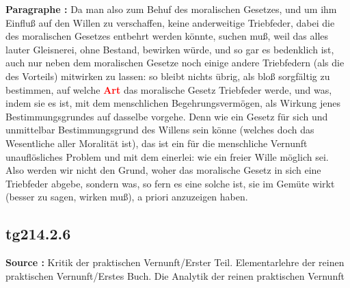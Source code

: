 \documentclass[a4paper,12pt,twoside]{book}
\newcommand{\match}[1]{\textcolor{red}{\textbf{#1}}}
\begin{document}
	\noindent\textbf{Paragraphe : }Da man also zum Behuf des moralischen Gesetzes, und um ihm Einfluß auf den Willen zu verschaffen, keine anderweitige Triebfeder, dabei die des moralischen Gesetzes entbehrt werden könnte, suchen muß, weil das alles lauter Gleisnerei, ohne Bestand, bewirken würde, und so gar es bedenklich ist, auch nur neben dem moralischen Gesetze noch einige andere Triebfedern (als die des Vorteils) mitwirken zu lassen: so bleibt nichts übrig, als bloß sorgfältig zu bestimmen, auf welche \match{Art} das moralische Gesetz Triebfeder werde, und was, indem sie es ist, mit dem menschlichen Begehrungsvermögen, als Wirkung jenes Bestimmungsgrundes auf dasselbe vorgehe. Denn wie ein Gesetz für sich und unmittelbar Bestimmungsgrund des Willens sein könne (welches doch das Wesentliche aller Moralität ist), das ist ein für die menschliche Vernunft unauflösliches Problem und mit dem einerlei: wie ein freier Wille möglich sei. Also werden wir nicht den Grund, woher das moralische Gesetz in sich eine Triebfeder abgebe, sondern was, so fern es eine solche ist, sie im Gemüte wirkt (besser zu sagen, wirken muß), a priori anzuzeigen haben. 
	
	\subsection*{tg214.2.6} 
	\textbf{Source : }Kritik der praktischen Vernunft/Erster Teil. Elementarlehre der reinen praktischen Vernunft/Erstes Buch. Die Analytik der reinen praktischen Vernunft\\  
	
\end{document}
